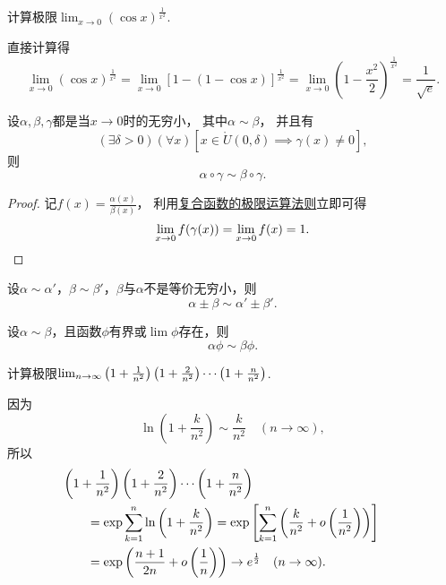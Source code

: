 \begin{example}
计算极限\(\lim_{x\to0} (\cos x)^{\frac1{x^2}}\).
\begin{solution}
直接计算得\[
	\lim_{x\to0} (\cos x)^{\frac1{x^2}}
	= \lim_{x\to0} [1-(1-\cos x)]^{\frac1{x^2}}
	= \lim_{x\to0} \left(1-\frac{x^2}2\right)^{\frac1{x^2}}
	= \frac1{\sqrt{e}}.
\]
\end{solution}
\end{example}

\begin{proposition}[等价无穷小的换元法]
设\(\alpha,\beta,\gamma\)都是当\(x\to0\)时的无穷小，
其中\(\alpha \sim \beta\)，
并且有\[
	(\exists\delta>0)
	(\forall x)
	[
		x\in\mathring{U}(0,\delta)
		\implies
		\gamma(x) \neq 0
	],
\]
则\[
	\alpha\circ\gamma \sim \beta\circ\gamma.
\]
\begin{proof}
记\(f(x) = \frac{\alpha(x)}{\beta(x)}\)，
利用\hyperref[theorem:极限.复合函数的极限运算法则1]{复合函数的极限运算法则}立即可得\[
	\lim_{x\to0} f(\gamma(x))
	= \lim_{x\to0} f(x)
	= 1.
	\qedhere
\]
\end{proof}
\end{proposition}

\begin{proposition}[和差代替规则]\label{theorem:极限.无穷小的比较4}
设\(\alpha\sim\alpha'\)，\(\beta\sim\beta'\)，\(\beta\)与\(\alpha\)不是等价无穷小，则\[
	\alpha\pm\beta\sim\alpha'\pm\beta'.
\]
\end{proposition}

\begin{proposition}[因式代替规则]\label{theorem:极限.无穷小的比较5}
设\(\alpha\sim\beta\)，且函数\(\phi\)有界或\(\lim\phi\)存在，则\[
	\alpha \phi \sim \beta \phi.
\]
\end{proposition}

\begin{example}
计算极限\(\lim_{n\to\infty} \left(1+\frac1{n^2}\right)\left(1+\frac2{n^2}\right)\dotsm\left(1+\frac{n}{n^2}\vphantom{\frac1{n^2}}\right)\).
\begin{solution}
因为\[
	\ln\left(1+\frac{k}{n^2}\right)
	\sim \frac{k}{n^2}
	\quad(n\to\infty),
\]
所以\begin{align*}
	&\hspace{-20pt}
	\left(1+\frac1{n^2}\right)\left(1+\frac2{n^2}\right)\dotsm\left(1+\frac{n}{n^2}\vphantom{\frac1{n^2}}\right) \\
	&= \exp\sum_{k=1}^n \ln\left(1+\frac{k}{n^2}\right)
	= \exp\left[ \sum_{k=1}^n \left(\frac{k}{n^2} + o\left(\frac1{n^2}\right)\right) \right] \\
	&= \exp\left( \frac{n+1}{2n} + o\left(\frac1n\right) \right)
	\to e^{\frac12}
	\quad(n\to\infty).
\end{align*}
\end{solution}
\end{example}
